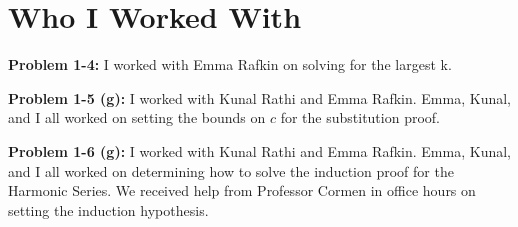 \documentclass[11pt]{article}
\begin{document}
\newpage

\section{Who I Worked With}

\textbf{Problem 1-4:} I worked with Emma Rafkin on solving for the largest k.

\textbf{Problem 1-5 (g):} I worked with Kunal Rathi and Emma Rafkin. Emma, Kunal, and I all worked on setting the bounds on $c$ for the substitution proof.

\textbf{Problem 1-6 (g):} I worked with Kunal Rathi and Emma Rafkin. Emma, Kunal, and I all worked on determining how to solve the induction proof for the Harmonic Series. We received help from Professor Cormen in office hours on setting the induction hypothesis.
\end{document}
